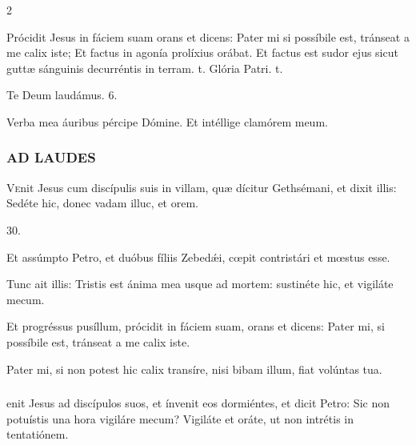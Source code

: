 \documentclass[9pt,twoside]{extarticle}
\begin{document}
\begin{multicols}{2}
\begin{tightlist}{}
\item \item {} Prócidit Jesus in fáciem suam orans et dicens: Pater mi si possíbile est, tránseat a me calix iste; \textred{*} Et factus in agonía prolíxius orábat.  Et factus est sudor ejus sicut guttæ sánguinis decurréntis in terram. t. Glória Patri. t.
\item Te Deum laudámus. 6.
\item {} Verba mea áuribus pércipe Dómine.  Et intéllige clamórem meum.
\end{tightlist}

\subsubsection*{\center \textsc{AD LAUDES}}
\begin{center}\end{center}
\lettrine{V}enit Jesus cum discípulis suis in villam, quæ dícitur Gethsémani, et dixit illis: Sedéte hic, donec vadam illuc, et orem.

\begin{tightlist}{}
\item {} 30.
\item {} Et assúmpto Petro, et duóbus fíliis Zebedǽi, cœpit contristári et mœstus esse.
\item {} Tunc ait illis: Tristis est ánima mea usque ad mortem: sustinéte hic, et vigiláte mecum.
\item {} Et progréssus pusíllum, prócidit in fáciem suam, orans et dicens: Pater mi, si possíbile est, tránseat a me calix iste.
\item {} Pater mi, si non potest hic calix transíre, nisi bibam illum, fiat volúntas tua.
\end{tightlist}
\subsubsection*{}
enit Jesus ad discípulos suos, et ínvenit eos dormiéntes, et dicit Petro: Sic non potuístis una hora vigiláre mecum? Vigiláte et oráte, ut non intrétis in tentatiónem.


\end{multicols}
\end{document}
